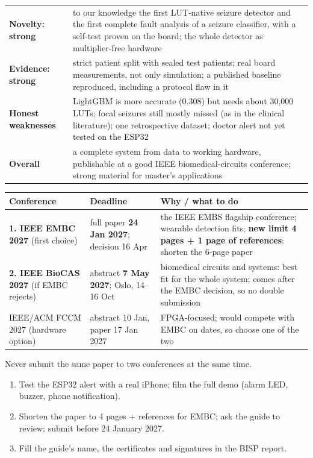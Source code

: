 \documentclass[11pt,a4paper]{article}
\newcommand{\sect}[1]{\vspace{3pt}{\large\bfseries #1}\par\vspace{1pt}}
\begin{document}
\sect{How good is it}
\begin{tabularx}{\textwidth}{@{}P{38mm}L@{}}
\textbf{Novelty: strong} & to our knowledge the first LUT-native seizure detector and the first complete fault analysis of a seizure
classifier, with a self-test proven on the board; the whole detector as multiplier-free hardware\\
\textbf{Evidence: strong} & strict patient split with sealed test patients; real board measurements, not only
simulation; a published baseline reproduced, including a protocol flaw in it\\
\textbf{Honest weaknesses} & LightGBM is more accurate (0.308) but needs about 30,000 LUTs; focal seizures still mostly
missed (as in the clinical literature); one retrospective dataset; doctor alert not yet tested on the ESP32\\
\textbf{Overall} & a complete system from data to working hardware, publishable at a good IEEE biomedical-circuits
conference; strong material for master's applications\\
\end{tabularx}

\sect{Where to submit (deadlines from the official pages, checked 20 Nov 2026)}
\begin{tabularx}{\textwidth}{@{}P{34mm}P{40mm}L@{}}
\toprule
\textbf{Conference} & \textbf{Deadline} & \textbf{Why / what to do}\\
\midrule
\textbf{1. IEEE EMBC 2027} (first choice) & full paper \textbf{24 Jan 2027}; decision 16 Apr & the IEEE EMBS flagship
conference; wearable detection fits; \textbf{new limit 4 pages + 1 page of references}: shorten the 6-page paper\\
\textbf{2. IEEE BioCAS 2027} (if EMBC rejects) & abstract \textbf{7 May 2027}; Oslo, 14--16 Oct & biomedical circuits and
systems: best fit for the whole system; comes after the EMBC decision, so no double submission\\
IEEE/ACM FCCM 2027 (hardware option) & abstract 10 Jan, paper 17 Jan 2027 & FPGA-focused; would compete with EMBC on
dates, so choose one of the two\\
\bottomrule
\end{tabularx}
{\small Never submit the same paper to two conferences at the same time.}

\sect{Next steps}
\begin{enumerate}[leftmargin=14pt]
\item Test the ESP32 alert with a real iPhone; film the full demo (alarm LED, buzzer, phone notification).
\item Shorten the paper to 4 pages + references for EMBC; ask the guide to review; submit before 24 January 2027.
\item Fill the guide's name, the certificates and signatures in the BISP report.
\end{enumerate}
\end{document}
